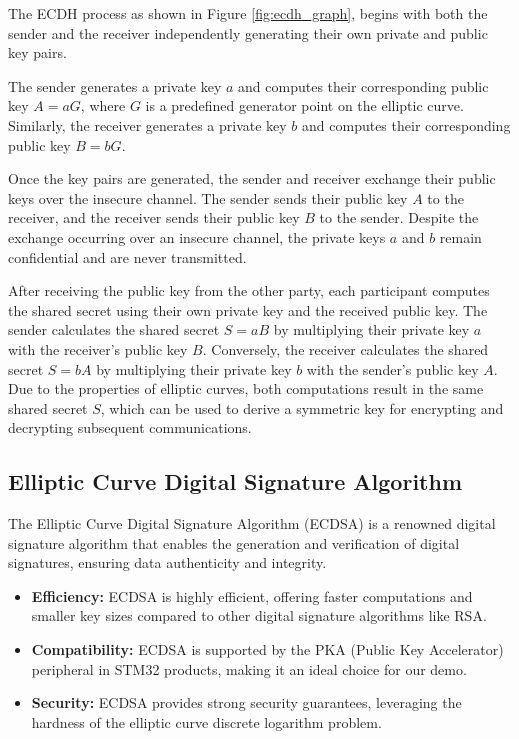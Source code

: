 The ECDH process as shown in Figure \ref{fig:ecdh_graph}, begins with both the sender and the receiver independently generating their own private and public key pairs.

The sender generates a private key \(a\) and computes their corresponding public key \(A = aG\), where \(G\) is a predefined generator point on the elliptic curve. Similarly, the receiver generates a private key \(b\) and computes their corresponding public key \(B = bG\).

Once the key pairs are generated, the sender and receiver exchange their public keys over the insecure channel. The sender sends their public key \(A\) to the receiver, and the receiver sends their public key \(B\) to the sender. Despite the exchange occurring over an insecure channel, the private keys \(a\) and \(b\) remain confidential and are never transmitted.

After receiving the public key from the other party, each participant computes the shared secret using their own private key and the received public key. The sender calculates the shared secret \(S = aB\) by multiplying their private key \(a\) with the receiver's public key \(B\). Conversely, the receiver calculates the shared secret \(S = bA\) by multiplying their private key \(b\) with the sender's public key \(A\). Due to the properties of elliptic curves, both computations result in the same shared secret \(S\), which can be used to derive a symmetric key for encrypting and decrypting subsequent communications.



\subsection{Elliptic Curve Digital Signature Algorithm}
The Elliptic Curve Digital Signature Algorithm (ECDSA) is a renowned digital signature algorithm that enables the generation and verification of digital signatures, ensuring data authenticity and integrity.

\begin{itemize}
    \item \textbf{Efficiency:} ECDSA is highly efficient, offering faster computations and smaller key sizes compared to other digital signature algorithms like RSA.
    \item \textbf{Compatibility:} ECDSA is supported by the PKA (Public Key Accelerator) peripheral in STM32 products, making it an ideal choice for our demo.
    \item \textbf{Security:} ECDSA provides strong security guarantees, leveraging the hardness of the elliptic curve discrete logarithm problem.
\end{itemize}

